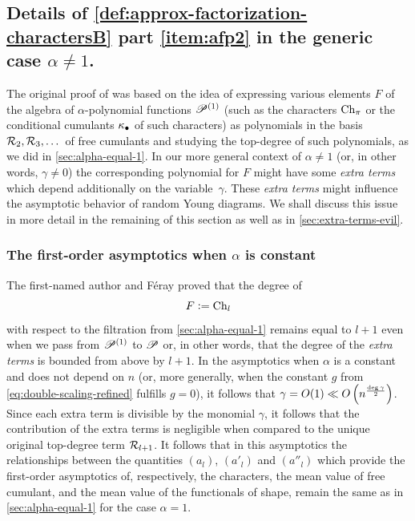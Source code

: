 \documentclass[12pt,usenames,dvipsnames,svgnames,table]{amsart}
\begin{document}
\subsection{Details of \cref{def:approx-factorization-charactersB} part \ref{item:afp2}  
	in the generic case $\alpha\neq 1$.}
\label{sec:co-sie-dzieje-alpha-neq-1}
The original proof of \cite[Theorem and Definition 1]{Sniady2006c}
was based on the idea of expressing various elements $F$ of the algebra
of $\alpha$-polynomial functions $\mathscr{P}^{(1)}$
(such as the characters $\operatorname{Ch}_\pi$ or the conditional
cumulants $\kappa_{\bullet}$ of such characters)
as polynomials in the basis $\mathcal{R}_2,\mathcal{R}_3,\dots$
of free cumulants and studying the top-degree of such polynomials, as we did in \cref{sec:alpha-equal-1}.
In our more general context of $\alpha\neq 1$ (or, in other words, $\gamma\neq 0$)
the corresponding polynomial for $F$
might have some \emph{extra terms} which depend additionally on the variable~$\gamma$. 
These \emph{extra terms} might influence the asymptotic behavior of random Young diagrams.
We shall discuss this issue in more detail in the remaining of this section
as well as in \cref{sec:extra-terms-evil}.

\subsubsection{The first-order asymptotics when $\alpha$ is constant}

The first-named author and F\'eray \cite[Proposition 3.7]{DolegaFeray2014}
proved that the degree of 
\begin{equation}
\label{eq:F1} 
F :=  \operatorname{Ch}_l    
\end{equation}
with respect to the filtration from \cref{sec:alpha-equal-1}
remains equal to $l+1$ even when we pass from $\mathscr{P}^{(1)}$ to $\mathscr{P}$
or, in other words, that the degree of the \emph{extra terms} is bounded from above by $l+1$.
In the asymptotics when $\alpha$ is a constant and does not depend on $n$
(or, more generally, when the constant $g$ from \eqref{eq:double-scaling-refined} fulfills $g=0$),
it follows that $\gamma=O(1) \ll O\left( n^{\frac{\operatorname{deg} \gamma}{2}}\right) $.
Since each extra term is divisible by the monomial $\gamma$, it follows 
that the contribution of the extra terms
is negligible when compared to the unique original top-degree term $\mathcal{R}_{l+1}$. 
It follows that in this asymptotics the relationships between the 
quantities $(a_l)$, $(a'_l)$ and $(a''_l)$ which provide the first-order asymptotics of, respectively,
the characters, the mean value of free cumulant, and the mean value of the functionals of shape, remain the same
as in \cref{sec:alpha-equal-1} for the case $\alpha=1$.
\end{document}
